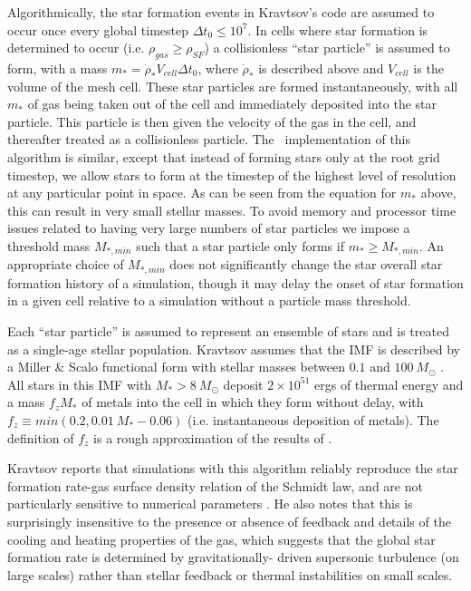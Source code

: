 Algorithmically, the star formation events in Kravtsov's code
are assumed to occur once every global timestep 
$\Delta t_0 \leq 10^7$.  In cells where star formation is
determined to occur (i.e. $\rho_{gas} \geq \rho_{SF}$) a
collisionless ``star particle'' is assumed to form, with a 
mass $m_* = \dot{\rho}_* V_{cell} \Delta t_0$, where
$\dot{\rho}_*$ is described above and $V_{cell}$ is the 
volume of the mesh cell.  These star particles are
formed instantaneously, with all $m_*$ of gas being
taken out of the cell and immediately deposited into the
star particle.  This particle is then given the velocity
of the gas in the cell, and thereafter treated as a 
collisionless particle.  The \enzo\ implementation
of this algorithm is similar, except that instead of 
forming stars only at the root grid timestep, we allow 
stars to form at the timestep of the highest level of
resolution at any particular point in space.  As can be seen
from the equation for $m_*$ above, this can result in very 
small stellar masses.  To avoid memory and processor time
issues related to having very large numbers of star particles
we impose a threshold mass $M_{*,min}$ such that a star
particle only forms if $m_* \geq M_{*,min}$.  An
appropriate choice of $M_{*,min}$ does not significantly 
change the star overall star formation history of a 
simulation, though it may delay the onset of star formation 
in a given cell relative to a simulation without a particle mass
threshold.

Each ``star particle'' is assumed to represent an ensemble
of stars and is treated as a single-age stellar population.
Kravtsov assumes that the IMF is described by a
Miller \& Scalo functional form with stellar masses between
$0.1$ and $100~M_\odot$ \citep{1979ApJS...41..513M}.  All stars in this
IMF with $M_* > 8~M_\odot$ deposit $2 \times 10^{51}$ ergs of
thermal energy and a mass $f_z M_*$ of metals into the
cell in which they form without delay, with
$f_z \equiv min(0.2, 0.01~M_*-0.06)$ (i.e. instantaneous
deposition of metals).  The definition of $f_z$ is a rough
approximation of the results of 
\citet{1995ApJS..101..181W}.

Kravtsov reports that simulations with this algorithm
reliably reproduce the star formation rate-gas surface
density relation of the Schmidt law, and are not particularly
sensitive to numerical parameters \citep{2003ApJ...590L...1K}.
He also notes that this is surprisingly insensitive to
the presence or absence of feedback and details of the cooling
and heating properties of the gas, which suggests that the
global star formation rate is determined by gravitationally-
driven supersonic turbulence (on large scales)
rather than stellar feedback or thermal instabilities on small 
scales.

